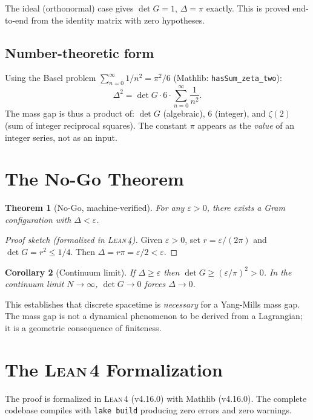 \documentclass[12pt]{article}
\newtheorem{theorem}{Theorem}[section]
\newtheorem{corollary}[theorem]{Corollary}
\theoremstyle{definition}
\theoremstyle{remark}
\newcommand{\Lean}{\textsc{Lean\,4}}
\begin{document}
The ideal (orthonormal) case gives
$\det G = 1$, $\Delta = \pi$ exactly. This is proved
end-to-end from the identity matrix with zero hypotheses.

\subsection{Number-theoretic form}

Using the Basel problem $\sum_{n=0}^{\infty} 1/n^2
= \pi^2/6$ (Mathlib: \texttt{hasSum\_zeta\_two}):
\[
  \Delta^2 = \det G \cdot 6 \cdot
  \sum_{n=0}^{\infty} \frac{1}{n^2}.
\]
The mass gap is thus a product of: $\det G$ (algebraic),
$6$ (integer), and $\zeta(2)$ (sum of integer reciprocal
squares). The constant $\pi$ appears as the \emph{value}
of an integer series, not as an input.

\section{The No-Go Theorem}

\begin{theorem}[No-Go, machine-verified]
For any $\varepsilon > 0$, there exists a Gram
configuration with $\Delta < \varepsilon$.
\end{theorem}

\begin{proof}[Proof sketch (formalized in \Lean)]
Given $\varepsilon > 0$, set
$r = \varepsilon/(2\pi)$ and
$\det G = r^2 \le 1/4$. Then
$\Delta = r\pi = \varepsilon/2 < \varepsilon$.
\end{proof}

\begin{corollary}[Continuum limit]
If $\Delta \ge \varepsilon$ then
$\det G \ge (\varepsilon/\pi)^2 > 0$.
In the continuum limit $N \to \infty$, $\det G \to 0$
forces $\Delta \to 0$.
\end{corollary}

This establishes that discrete spacetime is
\emph{necessary} for a Yang-Mills mass gap.
The mass gap is not a dynamical phenomenon to be
derived from a Lagrangian; it is a geometric
consequence of finiteness.

\section{The \Lean{} Formalization}

The proof is formalized in \Lean{} (v4.16.0)
with Mathlib (v4.16.0). The complete codebase
compiles with \texttt{lake build} producing
zero errors and zero warnings.
\end{document}
